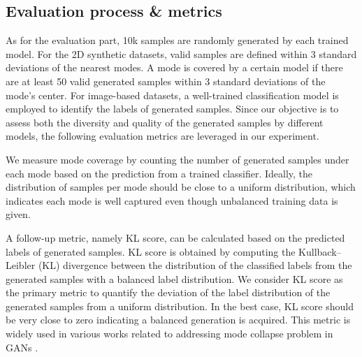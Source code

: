 \subsection{Evaluation process \& metrics}
As for the evaluation part, 10k samples are randomly generated by each trained model. For the 2D synthetic datasets, valid samples are defined within 3 standard deviations of the nearest modes. A mode is covered by a certain model if there are at least 50 valid generated samples within 3 standard deviations of the mode's center. For image-based datasets, a well-trained classification model is employed to identify the labels of generated samples. Since our objective is to assess both the diversity and quality of the generated samples by different models, the following evaluation metrics are leveraged in our experiment.
\begin{description}[leftmargin=0pt]
    \item[Number of generated samples per mode] We measure mode coverage by counting the number of generated samples under each mode based on the prediction from a trained classifier. Ideally, the distribution of samples per mode should be close to a uniform distribution, which indicates each mode is well captured even though unbalanced training data is given. 

    \item[KL score] A follow-up metric, namely KL score, can be calculated based on the predicted labels of generated samples. KL score is obtained by computing the Kullback–Leibler (KL) divergence between the distribution of the classified labels from the generated samples with a balanced label distribution. We consider KL score as the primary metric to quantify the deviation of the label distribution of the generated samples from a uniform distribution. In the best case, KL score should be very close to zero indicating a balanced generation is acquired. This metric is widely used in various works related to addressing mode collapse problem in GANs \cite{schreursLeverageScoreSampling2022, anaissiDamageGANGenerative2024, yuInclusiveGANImproving2020, demeulemeesterBuresMetricGenerative2021}.


\end{description}
